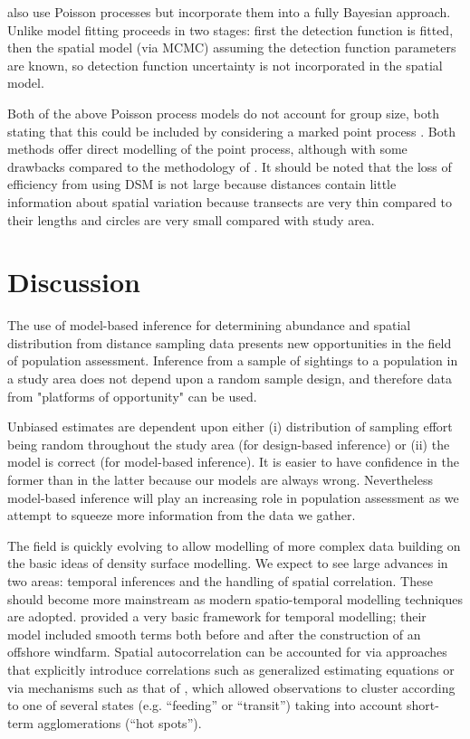 \documentclass[a4paper,12pt]{article}
\begin{document}
\cite{Niemi:2010kx} also use Poisson processes but incorporate them into a fully Bayesian approach. Unlike \cite{Johnson:2010gf} model fitting proceeds in two stages: first the detection function is fitted, then the spatial model (via MCMC) assuming the detection function parameters are known, so detection function uncertainty is not incorporated in the spatial model.

Both of the above Poisson process models do not account for group size, both stating that this could be included by considering a marked point process \citep[Section 5.5]{cox1980point}. Both methods offer direct modelling of the point process, although with some drawbacks compared to the methodology of \cite{Hedley:2004et}. It should be noted that the loss of efficiency from using DSM is not large \citep[p. 313]{Buckland:2004ts} because distances contain little information about spatial variation because transects are very thin compared to their lengths and circles are very small compared with study area.


\section*{Discussion}
\label{s:discussion}

The use of model-based inference for determining abundance and spatial distribution from distance sampling data presents new opportunities in the field of population assessment.   Inference from a sample of sightings to a population in a study area does not depend upon a random sample design, and therefore data from "platforms of opportunity" \citep{Williams:2006tz} can be used.

Unbiased estimates are dependent upon either (i) distribution of sampling effort being random throughout the study area (for design-based inference) or (ii) the model is correct (for model-based inference).  It is easier to have confidence in the former than in the latter because our models are always wrong. Nevertheless model-based inference will play an increasing role in population assessment as we attempt to squeeze more information from the data we gather.

The field is quickly evolving to allow modelling of more complex data building on the basic ideas of density surface modelling. We expect to see large advances in two areas: temporal inferences and the handling of spatial correlation. These should become more mainstream as modern spatio-temporal modelling techniques are adopted. \cite{Petersen:2011vy} provided a very basic framework for temporal modelling; their model included smooth terms both before and after the construction of an offshore windfarm. Spatial autocorrelation can be accounted for via approaches that explicitly introduce correlations such as generalized estimating equations \cite[GEEs;][]{Hardin:2003uf} or via mechanisms such as that of \cite{Skaug:2006gs}, which allowed observations to cluster according to one of several states (e.g. ``feeding'' or ``transit'') taking into account short-term agglomerations (``hot spots'').
\end{document}
